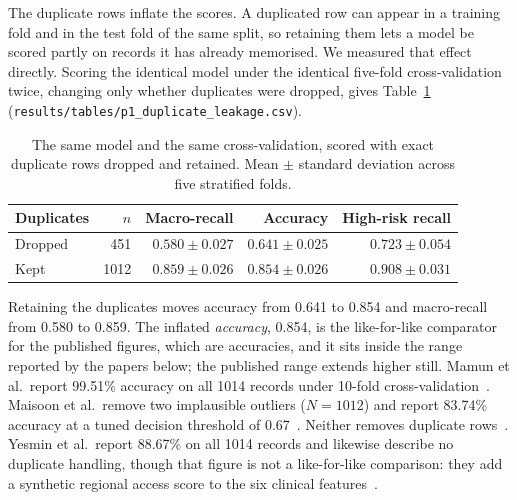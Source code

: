 The duplicate rows inflate the scores. A duplicated row can appear in
a training fold and in the test fold of the same split, so retaining them
lets a model be scored partly on records it has already memorised. We
measured that effect directly. Scoring the identical model under the
identical five-fold cross-validation twice, changing only whether duplicates
were dropped, gives Table~\ref{tab:leakage}
(\texttt{results/tables/p1\_duplicate\_leakage.csv}).

\begin{table}[t]
\centering
\caption{The same model and the same cross-validation, scored with exact
duplicate rows dropped and retained. Mean $\pm$ standard deviation across
five stratified folds.}
\label{tab:leakage}
\begin{tabular}{lrrrr}
\toprule
Duplicates & $n$ & Macro-recall & Accuracy & High-risk recall \\
\midrule
Dropped & 451  & $0.580 \pm 0.027$ & $0.641 \pm 0.025$ & $0.723 \pm 0.054$ \\
Kept    & 1012 & $0.859 \pm 0.026$ & $0.854 \pm 0.026$ & $0.908 \pm 0.031$ \\
\bottomrule
\end{tabular}
\end{table}

Retaining the duplicates moves accuracy from 0.641 to 0.854 and macro-recall
from 0.580 to 0.859. The inflated \emph{accuracy}, 0.854, is the like-for-like
comparator for the published figures, which are accuracies, and it sits inside
the range reported by the papers below; the published range extends
higher still. Mamun et al.\ report 99.51\% accuracy on all 1014 records under
10-fold cross-validation~\citep{mamun2025identification}. Maisoon et al.\
remove two implausible outliers ($N = 1012$) and report 83.74\% accuracy at a
tuned decision threshold of 0.67~\citep{maisoon2026stratification}. Neither removes duplicate
rows~\citep{mamun2025identification,maisoon2026stratification}. Yesmin et
al.\ report 88.67\% on all 1014 records and likewise describe no duplicate handling, though that figure is not a
like-for-like comparison: they add a synthetic regional access score to the
six clinical features~\citep{yesmin2026trust}.

